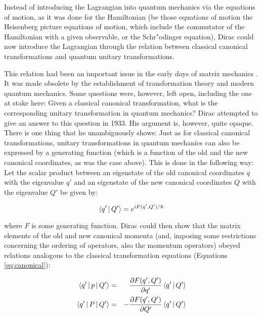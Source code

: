 \documentclass[12pt]{article}
\begin{document}
Instead of introducing the Lagrangian into quantum mechanics via the equations of motion, as it was done for the Hamiltonian (be those equations of motion the Heisenberg picture equations of motion, which include the commutator of the Hamiltonian with a given observable, or the Schr"odinger equation), Dirac could now introduce the Lagrangian through the relation between classical canonical transformations and quantum unitary transformations. 

This relation had been an important issue in the early days of matrix mechanics \citep{lacki_2004_the-puzzle}. It was made obsolete by the establishment of transformation theory and modern quantum mechanics. Some questions were, however, left open, including the one at stake here: Given a classical canonical transformation, what is the corresponding unitary transformation in quantum mechanics? Dirac attempted to give an answer to this question in 1933. His argument is, however, quite opaque. There is one thing that he unambiguously shows: Just as for classical canonical transformations, unitary transformations in quantum mechanics can also be expressed by a generating function (which is a function of the old and the new canonical coordinates, as was the case above). This is done in the following way: Let the scalar product between an eigenstate of the old canonical coordinates $q$ with the eigenvalue $q'$ and an eigenstate of the new canonical coordinates $Q$ with the eigenvalue $Q'$ be given by:

\begin{equation}
\Braket{q' | Q' } = e^{i F(q', Q') / \hbar}
\end{equation}

where $F$ is some generating function. Dirac could then show that the matrix elements of the old and new canonical momenta (and, imposing some restrictions concerning the ordering of operators, also the momentum operators) obeyed relations analogous to the classical transformation equations (Equations \ref{eq:canonical}):

\begin{eqnarray}
\Braket{q' | p | Q' } & = & \frac{\partial F(q',Q')}{\partial q'}  \Braket{q' | Q' }\nonumber\\
\Braket{q' |P | Q' } & = & - \frac{\partial F(q',Q')}{\partial Q'} \Braket{q' | Q' }
\end{eqnarray}
\end{document}
